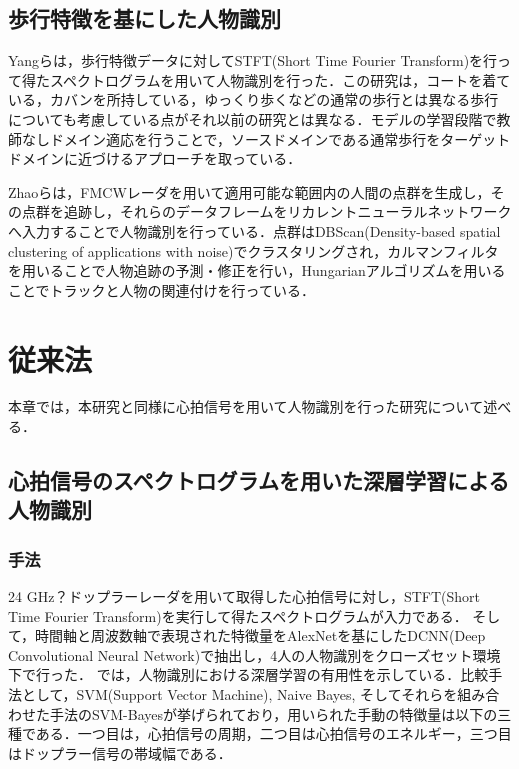 
\section{歩行特徴を基にした人物識別}
Yangらは，歩行特徴データに対してSTFT(Short Time Fourier Transform)を行って得たスペクトログラムを用いて人物識別を行った\cite{paper:unsupervised}．この研究は，コートを着ている，カバンを所持している，ゆっくり歩くなどの通常の歩行とは異なる歩行についても考慮している点がそれ以前の研究とは異なる．モデルの学習段階で教師なしドメイン適応を行うことで，ソースドメインである通常歩行をターゲットドメインに近づけるアプローチを取っている．

Zhaoらは，FMCWレーダを用いて適用可能な範囲内の人間の点群を生成し，その点群を追跡し，それらのデータフレームをリカレントニューラルネットワークへ入力することで人物識別を行っている\cite{paper:human_track}．点群はDBScan(Density-based spatial clustering of applications with noise)\cite{paper:dbscan}でクラスタリングされ，カルマンフィルタ\cite{paper:kalman}を用いることで人物追跡の予測・修正を行い，Hungarianアルゴリズム\cite{paper:Hungarian}を用いることでトラックと人物の関連付けを行っている．

\chapter{従来法}
本章では，本研究と同様に心拍信号を用いて人物識別を行った研究について述べる．

\section{心拍信号のスペクトログラムを用いた深層学習による人物識別\cite{paper:HeartID}}
\subsection{手法}
24 GHz？ドップラーレーダを用いて取得した心拍信号に対し，STFT(Short Time Fourier Transform)を実行して得たスペクトログラムが入力である．
そして，時間軸と周波数軸で表現された特徴量をAlexNetを基にしたDCNN(Deep Convolutional Neural Network)で抽出し，4人の人物識別をクローズセット環境下で行った．
\cite{paper:HeartID}では，人物識別における深層学習の有用性を示している．比較手法として，SVM(Support Vector Machine), Naive Bayes, そしてそれらを組み合わせた手法のSVM-Bayesが挙げられており，用いられた手動の特徴量は以下の三種である．一つ目は，心拍信号の周期，二つ目は心拍信号のエネルギー，三つ目はドップラー信号の帯域幅である．

